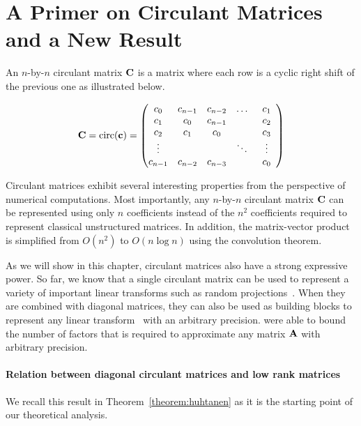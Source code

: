 \section{A Primer on Circulant Matrices and a New Result}
\label{section:circulant}

An $n$-by-$n$ circulant matrix $\mathbf{C}$ is a matrix where each row is a cyclic right shift of the previous one as illustrated below.

\begin{equation}
    \mathbf{C} = \mathrm{circ}(\mathbf{c}) = \begin{pmatrix}
    c_{0} & c_{n-1} & c_{n-2} & \dots & c_{1} \\
    c_{1} & c_{0} & c_{n-1} & & c_{2} \\
    c_{2} & c_{1} & c_{0}& & c_{3} \\
    \vdots & & & \ddots & \vdots \\
    c_{n-1} & c_{n-2} & c_{n-3} & & \phantom{0}c_{0}\phantom{0}
    \end{pmatrix}
\end{equation}

Circulant matrices exhibit several interesting properties from the perspective of numerical computations.
Most importantly, any $n$-by-$n$ circulant matrix $\mathbf{C}$ can be represented using only $n$ coefficients instead of the $n^2$ coefficients required to represent classical unstructured matrices.
In addition, the matrix-vector product is simplified from $O(n^2)$ to $O(n \log n)$ using the  convolution theorem.

As we will show in this chapter, circulant matrices also have a strong expressive power.
So far, we know that a single circulant matrix can be used to represent a variety of important linear transforms such as random projections~\cite{hinrichs2011johnson}. 
When they are combined with diagonal matrices, they can also be used as building blocks to represent any linear transform~\cite{schmid2000decomposing, Huhtanen2015} with an arbitrary precision.
\citet{Huhtanen2015} were able to bound the number of factors that is required to approximate any matrix $\mathbf{A}$ with arbitrary precision.

\paragraph{Relation between diagonal circulant matrices and low rank matrices}
We recall this result in Theorem~\ref{theorem:huhtanen} as it is the starting point of our theoretical analysis.


